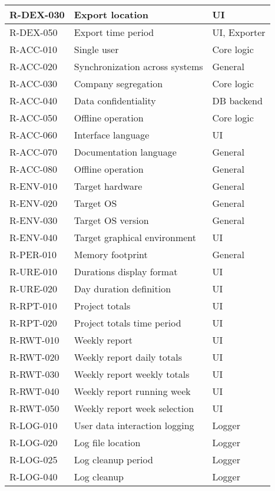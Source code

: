 \begin{longtable}{| p{} |
                    p{} |
                    p{} |}
  R-DEX-030 & Export location & UI \\ \hline
  R-DEX-050 & Export time period & UI, Exporter \\ \hline
  R-ACC-010 & Single user & Core logic \\ \hline
  R-ACC-020 & Synchronization across systems & General \\ \hline
  R-ACC-030 & Company segregation & Core logic \\ \hline
  R-ACC-040 & Data confidentiality & DB backend \\ \hline
  R-ACC-050 & Offline operation & Core logic \\ \hline
  R-ACC-060 & Interface language & UI \\ \hline
  R-ACC-070 & Documentation language & General \\ \hline
  R-ACC-080 & Offline operation & General \\ \hline
  R-ENV-010 & Target hardware & General \\ \hline
  R-ENV-020 & Target OS & General \\ \hline
  R-ENV-030 & Target OS version & General \\ \hline
  R-ENV-040 & Target graphical environment & UI \\ \hline
  R-PER-010 & Memory footprint & General \\ \hline
  R-URE-010 & Durations display format & UI \\ \hline
  R-URE-020 & Day duration definition & UI \\ \hline
  R-RPT-010 & Project totals & UI \\ \hline
  R-RPT-020 & Project totals time period & UI \\ \hline
  R-RWT-010 & Weekly report & UI \\ \hline
  R-RWT-020 & Weekly report daily totals & UI \\ \hline
  R-RWT-030 & Weekly report weekly totals & UI \\ \hline
  R-RWT-040 & Weekly report running week & UI \\ \hline
  R-RWT-050 & Weekly report week selection & UI \\ \hline
  R-LOG-010 & User data interaction logging & Logger \\ \hline
  R-LOG-020 & Log file location & Logger \\ \hline
  R-LOG-025 & Log cleanup period & Logger \\ \hline
  R-LOG-040 & Log cleanup & Logger \\ \hline

\end{longtable}
